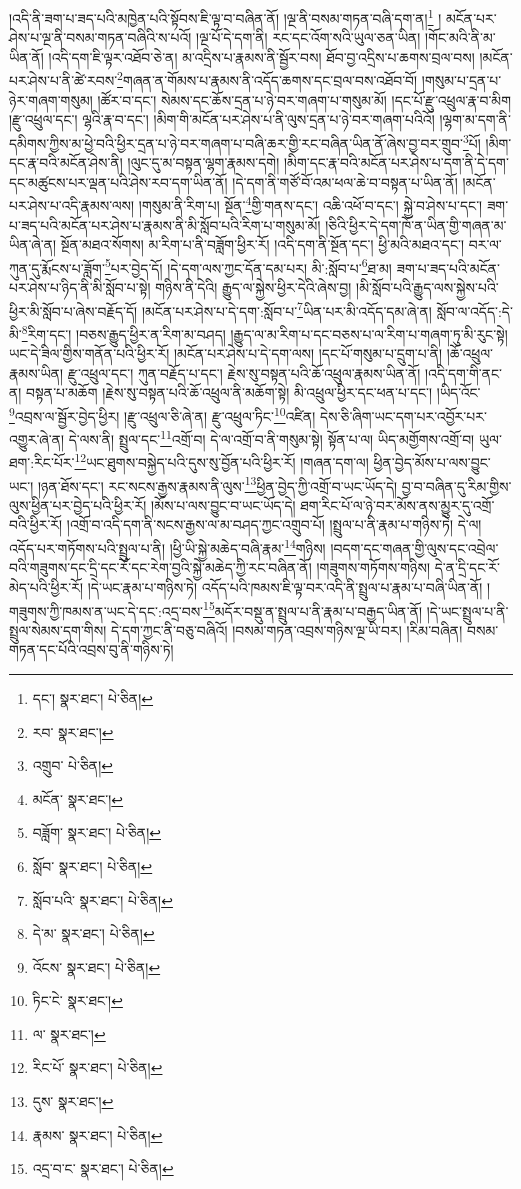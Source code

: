 །འདི་ནི་ཟག་པ་ཟད་པའི་མཁྱེན་པའི་སྟོབས་ཇི་ལྟ་བ་བཞིན་ནོ། །ལྔ་ནི་བསམ་གཏན་བཞི་དག་ན།\footnote{དང་།  སྣར་ཐང་།  པེ་ཅིན། } །
མངོན་པར་ཤེས་པ་ལྔ་ནི་བསམ་གཏན་བཞིའི་ས་པའོ། །ལྔ་པོ་དེ་དག་ནི། རང་དང་འོག་སའི་ཡུལ་ཅན་ཡིན། །གོང་མའི་ནི་མ་ཡིན་ནོ། །འདི་དག་ཇི་ལྟར་འཐོབ་ཅེ་ན། མ་འདྲིས་པ་རྣམས་ནི་སྦྱོར་བས། ཐོབ་བྱ་འདྲིས་པ་ཆགས་བྲལ་བས། །མངོན་པར་ཤེས་པ་ནི་ཚེ་རབས་\footnote{རབ་  སྣར་ཐང་། }གཞན་ན་གོམས་པ་རྣམས་ནི་འདོད་ཆགས་དང་བྲལ་བས་འཐོབ་བོ། །གསུམ་པ་དྲན་པ་ཉེར་གཞག་གསུམ། །ཚོར་བ་དང་། སེམས་དང་ཆོས་དྲན་པ་ཉེ་བར་གཞག་པ་གསུམ་མོ། །དང་པོ་རྫུ་འཕྲུལ་རྣ་བ་མིག །རྫུ་འཕྲུལ་དང་། ལྷའི་རྣ་བ་དང་། །མིག་གི་མངོན་པར་ཤེས་པ་ནི་ལུས་དྲན་པ་ཉེ་བར་གཞག་པའིའོ། །ལྷག་མ་དག་ནི་དམིགས་ཀྱིས་མ་ཕྱེ་བའི་ཕྱིར་དྲན་པ་ཉེ་བར་གཞག་པ་བཞི་ཆར་གྱི་རང་བཞིན་ཡིན་ནོ་ཞེས་བྱ་བར་གྲུབ་\footnote{འགྲུབ་  པེ་ཅིན། }པོ། །མིག་དང་རྣ་བའི་མངོན་ཤེས་ནི། །ལུང་དུ་མ་བསྟན་ལྷག་རྣམས་དགེ། །མིག་དང་རྣ་བའི་མངོན་པར་ཤེས་པ་དག་ནི་དེ་དག་དང་མཚུངས་པར་ལྡན་པའི་ཤེས་རབ་དག་ཡིན་ནོ། །དེ་དག་ནི་གཙོ་བོ་འམ་ཕལ་ཆེ་བ་བསྟན་པ་ཡིན་ནོ། །མངོན་པར་ཤེས་པ་འདི་རྣམས་ལས། །གསུམ་ནི་རིག་པ། སྔོན་\footnote{མངོན་  སྣར་ཐང་། }གྱི་གནས་དང་། འཆི་འཕོ་བ་དང་། སྐྱེ་བ་ཤེས་པ་དང་། ཟག་པ་ཟད་པའི་མངོན་པར་ཤེས་པ་རྣམས་ནི་མི་སློབ་པའི་རིག་པ་གསུམ་མོ། །ཅིའི་ཕྱིར་དེ་དག་ཁོ་ན་ཡིན་གྱི་གཞན་མ་ཡིན་ཞེ་ན། སྔོན་མཐའ་སོགས། མ་རིག་པ་ནི་བཟློག་ཕྱིར་རོ། །འདི་དག་ནི་སྔོན་དང་། ཕྱི་མའི་མཐའ་དང་། བར་ལ་ཀུན་དུ་རྨོངས་པ་ཟློག་\footnote{བཟློག་  སྣར་ཐང་།  པེ་ཅིན། }པར་བྱེད་དོ། །དེ་དག་ལས་ཀྱང་དོན་དམ་པར། མི་:སློབ་པ་\footnote{སློབ་  སྣར་ཐང་།  པེ་ཅིན། }ཐ་མ། ཟག་པ་ཟད་པའི་མངོན་པར་ཤེས་པ་ཉིད་ནི་མི་སློབ་པ་སྟེ། གཉིས་ནི་དེའི། རྒྱུད་ལ་སྐྱེས་ཕྱིར་དེའི་ཞེས་བྱ། །མི་སློབ་པའི་རྒྱུད་ལས་སྐྱེས་པའི་ཕྱིར་མི་སློབ་པ་ཞེས་བརྗོད་དོ། །མངོན་པར་ཤེས་པ་དེ་དག་:སློབ་པ་\footnote{སློབ་པའི་  སྣར་ཐང་།  པེ་ཅིན། }ཡིན་པར་མི་འདོད་དམ་ཞེ་ན། སློབ་ལ་འདོད་:དེ་མི་\footnote{དེ་མ་  སྣར་ཐང་།  པེ་ཅིན། }རིག་དང་། །བཅས་རྒྱུད་ཕྱིར་ན་རིག་མ་བཤད། །རྒྱུད་ལ་མ་རིག་པ་དང་བཅས་པ་ལ་རིག་པ་གཞག་ཏུ་མི་རུང་སྟེ། ཡང་དེ་ཟིལ་གྱིས་གནོན་པའི་ཕྱིར་རོ། །མངོན་པར་ཤེས་པ་དེ་དག་ལས། །དང་པོ་གསུམ་པ་དྲུག་པ་ནི། །ཆོ་འཕྲུལ་རྣམས་ཡིན། རྫུ་འཕྲུལ་དང་། ཀུན་བརྗོད་པ་དང་། རྗེས་སུ་བསྟན་པའི་ཆོ་འཕྲུལ་རྣམས་ཡིན་ནོ། །འདི་དག་གི་ནང་ན། བསྟན་པ་མཆོག །རྗེས་སུ་བསྟན་པའི་ཆོ་འཕྲུལ་ནི་མཆོག་སྟེ། མི་འཕྲུལ་ཕྱིར་དང་ཕན་པ་དང་། །ཡིད་འོང་\footnote{འོངས་  སྣར་ཐང་།  པེ་ཅིན། }འབྲས་ལ་སྦྱོར་བྱེད་ཕྱིར། །རྫུ་འཕྲུལ་ཅི་ཞེ་ན། རྫུ་འཕྲུལ་ཏིང་\footnote{ཏིང་ངེ་  སྣར་ཐང་། }འཛིན། དེས་ཅི་ཞིག་ཡང་དག་པར་འབྱོར་པར་འགྱུར་ཞེ་ན། དེ་ལས་ནི། སྤྲུལ་དང་\footnote{ལ་  སྣར་ཐང་། }འགྲོ་བ། དེ་ལ་འགྲོ་བ་ནི་གསུམ་སྟེ། སྟོན་པ་ལ། ཡིད་མགྱོགས་འགྲོ་བ། ཡུལ་ཐག་:རིང་པོར་\footnote{རིང་པོ་  སྣར་ཐང་།  པེ་ཅིན། }ཡང་ཐུགས་བསྐྱེད་པའི་དུས་སུ་བྱོན་པའི་ཕྱིར་རོ། །གཞན་དག་ལ། ཕྱིན་བྱེད་མོས་པ་ལས་བྱུང་ཡང་། །ཉན་ཐོས་དང་། རང་སངས་རྒྱས་རྣམས་ནི་ལུས་\footnote{དུས་  སྣར་ཐང་། }ཕྱིན་བྱེད་ཀྱི་འགྲོ་བ་ཡང་ཡོད་དེ། བྱ་བ་བཞིན་དུ་རིམ་གྱིས་ལུས་ཕྱིན་པར་བྱེད་པའི་ཕྱིར་རོ། །མོས་པ་ལས་བྱུང་བ་ཡང་ཡོད་དེ། ཐག་རིང་པོ་ལ་ཉེ་བར་མོས་ནས་མྱུར་དུ་འགྲོ་བའི་ཕྱིར་རོ། །འགྲོ་བ་འདི་དག་ནི་སངས་རྒྱས་ལ་མ་བཤད་ཀྱང་འགྲུབ་པོ། །སྤྲུལ་པ་ནི་རྣམ་པ་གཉིས་ཏེ། དེ་ལ། འདོད་པར་གཏོགས་པའི་སྤྲུལ་པ་ནི། །ཕྱི་ཡི་སྐྱེ་མཆེད་བཞི་རྣམ་\footnote{རྣམས་  སྣར་ཐང་།  པེ་ཅིན། }གཉིས། །བདག་དང་གཞན་གྱི་ལུས་དང་འབྲེལ་བའི་གཟུགས་དང་དྲི་དང་རོ་དང་རེག་བྱའི་སྐྱེ་མཆེད་ཀྱི་རང་བཞིན་ནོ། །གཟུགས་གཏོགས་གཉིས། དེ་ན་དྲི་དང་རོ་མེད་པའི་ཕྱིར་རོ། །དེ་ཡང་རྣམ་པ་གཉིས་ཏེ། འདོད་པའི་ཁམས་ཇི་ལྟ་བར་འདི་ནི་སྤྲུལ་པ་རྣམ་པ་བཞི་ཡིན་ནོ། །གཟུགས་ཀྱི་ཁམས་ན་ཡང་དེ་དང་:འདྲ་བས་\footnote{འདྲ་བ་ང་  སྣར་ཐང་།  པེ་ཅིན། }མདོར་བསྡུ་ན་སྤྲུལ་པ་ནི་རྣམ་པ་བརྒྱད་ཡིན་ནོ། །དེ་ཡང་སྤྲུལ་པ་ནི་སྤྲུལ་སེམས་དག་གིས། དེ་དག་ཀྱང་ནི་བཅུ་བཞིའོ། །བསམ་གཏན་འབྲས་གཉིས་ལྔ་ཡི་བར། །རིམ་བཞིན། བསམ་གཏན་དང་པོའི་འབྲས་བུ་ནི་གཉིས་ཏེ། 